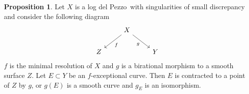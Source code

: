 \documentclass[11pt]{amsbook}
\theoremstyle{definition}
\theoremstyle{definition}
\theoremstyle{definition}
\newtheorem{prop}[thm]{Proposition}
\theoremstyle{definition}
\theoremstyle{definition}
\theoremstyle{definition}
\theoremstyle{definition}
\theoremstyle{definition}
\newcommand{\ldp}{log del Pezzo}
\begin{document}
\begin{prop}\label{MainProp}
Let $X$ is a \ldp\ with singularities of small discrepancy and 
consider the following diagram
\[
\begin{tikzcd}
  & X \arrow[rd, "\scriptstyle{g}"'] \arrow[ld, "\scriptstyle{f}"] &   \\
Z &                                                                & Y
\end{tikzcd}
\]
$f$ is the minimal resolution of $X$ and $g$ is a birational
morphism to a smooth surface $Z$.
Let $E\subset Y$ be an $f$-exceptional curve. Then $E$ is contracted to a point
of $Z$ by $g$, or $g(E)$ is a smooth curve and $g_E$ is an isomorphism.
\end{prop}
\end{document}
